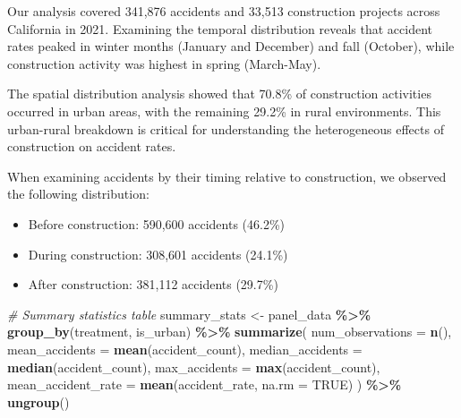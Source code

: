 \documentclass[
]{article}
\newenvironment{Shaded}{\begin{snugshade}}{\end{snugshade}}
\newcommand{\AttributeTok}[1]{\textcolor[rgb]{0.13,0.29,0.53}{#1}}
\newcommand{\CommentTok}[1]{\textcolor[rgb]{0.56,0.35,0.01}{\textit{#1}}}
\newcommand{\ConstantTok}[1]{\textcolor[rgb]{0.56,0.35,0.01}{#1}}
\newcommand{\FunctionTok}[1]{\textcolor[rgb]{0.13,0.29,0.53}{\textbf{#1}}}
\newcommand{\NormalTok}[1]{#1}
\newcommand{\OtherTok}[1]{\textcolor[rgb]{0.56,0.35,0.01}{#1}}
\newcommand{\SpecialCharTok}[1]{\textcolor[rgb]{0.81,0.36,0.00}{\textbf{#1}}}
\providecommand{\tightlist}{%
  \setlength{\itemsep}{0pt}\setlength{\parskip}{0pt}}
\begin{document}
Our analysis covered 341,876 accidents and 33,513 construction projects
across California in 2021. Examining the temporal distribution reveals
that accident rates peaked in winter months (January and December) and
fall (October), while construction activity was highest in spring
(March-May).

The spatial distribution analysis showed that 70.8\% of construction
activities occurred in urban areas, with the remaining 29.2\% in rural
environments. This urban-rural breakdown is critical for understanding
the heterogeneous effects of construction on accident rates.

When examining accidents by their timing relative to construction, we
observed the following distribution:

\begin{itemize}
\tightlist
\item
  Before construction: 590,600 accidents (46.2\%)
\item
  During construction: 308,601 accidents (24.1\%)
\item
  After construction: 381,112 accidents (29.7\%)
\end{itemize}

\begin{Shaded}
\begin{Highlighting}[]
\CommentTok{\# Summary statistics table}
\NormalTok{summary\_stats }\OtherTok{\textless{}{-}}\NormalTok{ panel\_data }\SpecialCharTok{\%\textgreater{}\%}
  \FunctionTok{group\_by}\NormalTok{(treatment, is\_urban) }\SpecialCharTok{\%\textgreater{}\%}
  \FunctionTok{summarize}\NormalTok{(}
    \AttributeTok{num\_observations =} \FunctionTok{n}\NormalTok{(),}
    \AttributeTok{mean\_accidents =} \FunctionTok{mean}\NormalTok{(accident\_count),}
    \AttributeTok{median\_accidents =} \FunctionTok{median}\NormalTok{(accident\_count),}
    \AttributeTok{max\_accidents =} \FunctionTok{max}\NormalTok{(accident\_count),}
    \AttributeTok{mean\_accident\_rate =} \FunctionTok{mean}\NormalTok{(accident\_rate, }\AttributeTok{na.rm =} \ConstantTok{TRUE}\NormalTok{)}
\NormalTok{  ) }\SpecialCharTok{\%\textgreater{}\%}
  \FunctionTok{ungroup}\NormalTok{()}
\end{Highlighting}
\end{Shaded}
\end{document}

